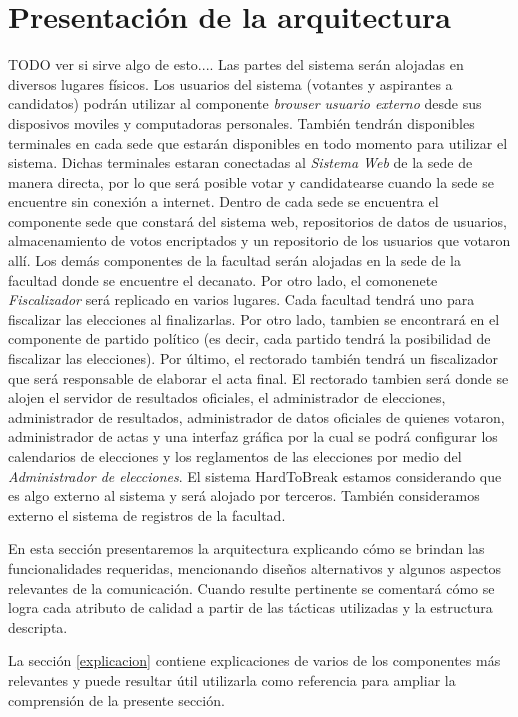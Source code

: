 \section{Presentación de la arquitectura}
TODO ver si sirve algo de esto....
Las partes del sistema ser\'an alojadas en diversos lugares f\'isicos. Los usuarios del sistema (votantes y aspirantes a candidatos) podr\'an utilizar al componente \emph{browser usuario externo} desde sus disposivos moviles y computadoras personales. Tambi\'en tendr\'an disponibles terminales en cada sede que estar\'an disponibles en todo momento para utilizar el sistema. Dichas terminales estaran conectadas al \emph{Sistema Web} de la sede de manera directa, por lo que ser\'a posible votar y candidatearse cuando la sede se encuentre sin conexi\'on a internet. Dentro de cada sede se encuentra el componente sede que constar\'a del sistema web, repositorios de datos de usuarios, almacenamiento de votos encriptados y un repositorio de los usuarios que votaron all\'i. 
Los dem\'as componentes de la facultad ser\'an alojadas en la sede de la facultad donde se encuentre el decanato. Por otro lado, el comonenete \emph{Fiscalizador} ser\'a replicado en varios lugares. Cada facultad tendr\'a uno para fiscalizar las elecciones al finalizarlas. Por otro lado, tambien se encontrar\'a en el componente de partido pol\'itico (es decir, cada partido tendr\'a la posibilidad de fiscalizar las elecciones). Por \'ultimo, el rectorado tambi\'en tendr\'a un fiscalizador que ser\'a responsable de elaborar el acta final. El rectorado tambien ser\'a donde se alojen el servidor de resultados oficiales, el administrador de elecciones, administrador de resultados, administrador de datos oficiales de quienes votaron, administrador de actas y una interfaz gr\'afica por la cual se podr\'a configurar los calendarios de elecciones y los reglamentos de las elecciones por medio del \emph{Administrador de elecciones}.
El sistema HardToBreak estamos considerando que es algo externo al sistema y ser\'a alojado por terceros. Tambi\'en consideramos externo el sistema de registros de la facultad.

En esta sección presentaremos la arquitectura explicando cómo se brindan las funcionalidades requeridas, mencionando diseños alternativos y algunos aspectos relevantes de la comunicación. Cuando resulte pertinente se comentará cómo se logra cada atributo de calidad a partir de las tácticas utilizadas y la estructura descripta. 


La sección \ref{explicacion} contiene explicaciones de varios de los componentes más relevantes y puede resultar útil utilizarla como referencia para ampliar la comprensión de la presente sección.


